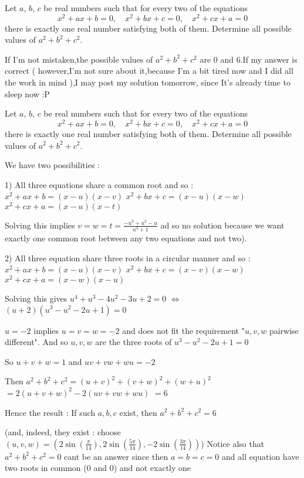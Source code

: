 \begin{solution}
	\begin{tcolorbox}Let $ a$, $ b$, $ c$ be real numbers such that for every two of the equations
\[ x^2 + ax + b = 0, \quad x^2 + bx + c = 0, \quad x^2 + cx + a = 0\]
there is exactly one real number satisfying both of them. Determine all possible values of $ a^2 + b^2 + c^2$.\end{tcolorbox}
If I'm not mistaken,the possible values of $ a^2 + b^2 + c^2$ are $ 0$ and $ 6$.If my answer is correct ( however,I'm not sure about it,because I'm a bit tired now and I did all the work in mind  ),I may  post my solution tomorrow, since It's already time to sleep now  :P
\end{solution}



\begin{solution}
	\begin{tcolorbox}Let $ a$, $ b$, $ c$ be real numbers such that for every two of the equations
\[ x^2 + ax + b = 0, \quad x^2 + bx + c = 0, \quad x^2 + cx + a = 0\]
there is exactly one real number satisfying both of them. Determine all possible values of $ a^2 + b^2 + c^2$.\end{tcolorbox}

We have two possibilities :

1) All three equations share a common root and so :
$ x^2+ax+b=(x-u)(x-v)$
$ x^2+bx+c=(x-u)(x-w)$
$ x^2+cx+a=(x-u)(x-t)$

Solving this implies $ v=w=t=\frac{-u^3+u^2-u}{u^3+1}$ ad so no solution because we want exactly one common root between any two equations and not two).

2) All three equation share three roots in a circular manner and so :
$ x^2+ax+b=(x-u)(x-v)$
$ x^2+bx+c=(x-v)(x-w)$
$ x^2+cx+a=(x-w)(x-u)$

Solving this gives $ u^4+u^3-4u^2-3u+2=0$ $ \iff$ $ (u+2)(u^3-u^2-2u+1)=0$

$ u=-2$ implies $ u=v=w=-2$ and does not fit the requirement "$ u,v,w$ pairwise different". And so $ u,v,w$ are the three roots of $ u^3-u^2-2u+1=0$

So $ u+v+w=1$ and $ uv+vw+wu=-2$

Then $ a^2+b^2+c^2=(u+v)^2+(v+w)^2+(w+u)^2$ $ =2(u+v+w)^2-2(uv+vw+wu)$ $ =6$

Hence the result : If such $ a,b,c$ exist, then $ \boxed{a^2+b^2+c^2=6}$

(and, indeed, they exist : choose $ (u,v,w)=(2\sin(\frac{\pi}{14}),2\sin(\frac{5\pi}{14}),-2\sin(\frac{3\pi}{14}))$)
Notice also that $ a^2+b^2+c^2=0$ cant be an answer since then $ a=b=c=0$ and all equation have two roots in common ($ 0$ and $ 0$) and not exactly one
\end{solution}



